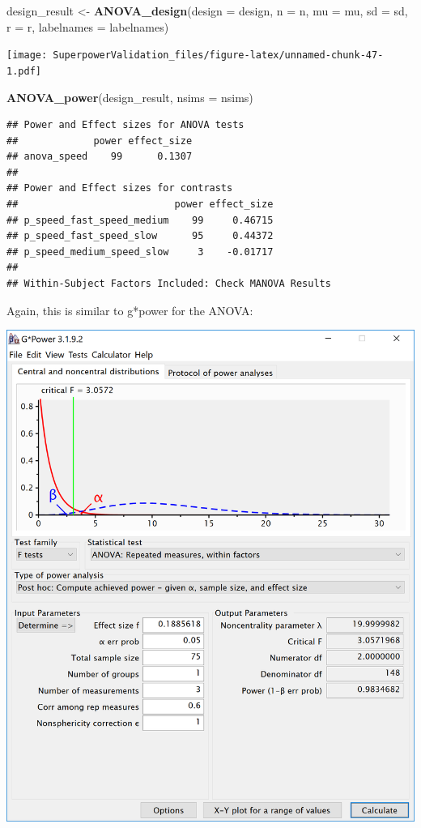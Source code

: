 \documentclass[]{book}
\newenvironment{Shaded}{\begin{snugshade}}{\end{snugshade}}
\newcommand{\DataTypeTok}[1]{\textcolor[rgb]{0.13,0.29,0.53}{#1}}
\newcommand{\KeywordTok}[1]{\textcolor[rgb]{0.13,0.29,0.53}{\textbf{#1}}}
\newcommand{\NormalTok}[1]{#1}
\newcommand{\StringTok}[1]{\textcolor[rgb]{0.31,0.60,0.02}{#1}}
\begin{document}
\begin{Shaded}
\begin{Highlighting}[]
\NormalTok{design_result <-}\StringTok{ }\KeywordTok{ANOVA_design}\NormalTok{(}\DataTypeTok{design =}\NormalTok{ design,}
                   \DataTypeTok{n =}\NormalTok{ n, }
                   \DataTypeTok{mu =}\NormalTok{ mu, }
                   \DataTypeTok{sd =}\NormalTok{ sd, }
                   \DataTypeTok{r =}\NormalTok{ r, }
                   \DataTypeTok{labelnames =}\NormalTok{ labelnames)}
\end{Highlighting}
\end{Shaded}

\texttt{[image: SuperpowerValidation\_files/figure-latex/unnamed-chunk-47-1.pdf]}

\begin{Shaded}
\begin{Highlighting}[]
\KeywordTok{ANOVA_power}\NormalTok{(design_result, }\DataTypeTok{nsims =}\NormalTok{ nsims)}
\end{Highlighting}
\end{Shaded}

\begin{verbatim}
## Power and Effect sizes for ANOVA tests
##             power effect_size
## anova_speed    99      0.1307
## 
## Power and Effect sizes for contrasts
##                           power effect_size
## p_speed_fast_speed_medium    99     0.46715
## p_speed_fast_speed_slow      95     0.44372
## p_speed_medium_speed_slow     3    -0.01717
## 
## Within-Subject Factors Included: Check MANOVA Results
\end{verbatim}

Again, this is similar to g*power for the ANOVA:

\includegraphics{screenshots/gpower_4.png}


\end{document}
